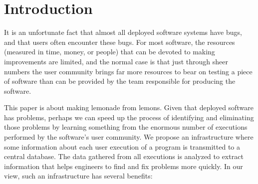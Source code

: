 \section{Introduction}

It is an unfortunate fact that almost all deployed software systems
have bugs, and that users often encounter these bugs.  For most
software, the resources (measured in time, money, or people) that can
be devoted to making improvements are limited, and the normal case is
that just through sheer numbers the user community brings far more
resources to bear on testing a piece of software than can be provided
by the team responsible for producing the software.

This paper is about making lemonade from lemons.  Given that deployed
software has problems, perhaps we can speed up the process of
identifying and eliminating those problems by learning something
from the enormous number of executions performed
by the software's user community.  We propose an infrastructure where 
some information about each user execution of a program is 
transmitted to a central database.  The data 
gathered from all executions is analyzed to extract information
that helps engineers to find and fix problems more quickly.
In our view, such an infrastructure has several benefits:
